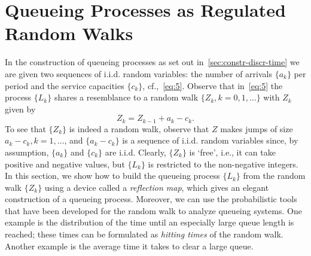 \section{Queueing Processes as Regulated Random Walks}
\label{sec:queu-proc-as}






In the construction of queueing processes as set out in~\cref{sec:constr-discr-time} we are given two sequences of i.i.d.
random variables: the number of arrivals $\{a_k\}$ per period and the service capacities $\{c_k\}$, cf.,~\cref{eq:5}.
Observe that in~\cref{eq:5} the process $\{L_k\}$ shares a resemblance to a random walk $\{Z_k, k=0,1,\ldots\}$ with $Z_k$ given by
\begin{equation}\label{eq:44}
 Z_k = Z_{k-1} + a_k - c_k.
\end{equation}
To see that $\{Z_k\}$ is indeed a random walk, observe that $Z$ makes jumps of size $a_k-c_k, k=1,\ldots$, and $\{a_k-c_k\}$ is a sequence of i.i.d.
random variables since, by assumption, $\{a_k\}$ and $\{c_k\}$ are i.i.d.
Clearly, $\{Z_k\}$ is `free', i.e., it can take positive and negative values, but $\{L_k\}$ is restricted to the non-negative integers.
In this section, we show how to build the queueing process $\{L_k\}$ from the random walk $\{Z_k\}$ using a device called a \emph{reflection map}, which gives an elegant construction of a queueing process.
Moreover, we can use the probabilistic tools that have been developed for the random walk to analyze queueing systems.
One example is the distribution of the time until an especially large queue length is reached; these times can be formulated as \emph{hitting times} of the random walk.
Another example is the average time it takes to clear a large queue.


